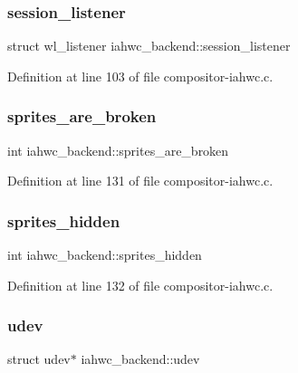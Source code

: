\subsubsection{\texorpdfstring{session\+\_\+listener}{session\_listener}}
{\footnotesize\ttfamily struct wl\+\_\+listener iahwc\+\_\+backend\+::session\+\_\+listener}



Definition at line 103 of file compositor-\/iahwc.\+c.

\mbox{\label{structiahwc__backend_ad046cdbf61ed56df228151a267a93f5d}} 
\subsubsection{\texorpdfstring{sprites\+\_\+are\+\_\+broken}{sprites\_are\_broken}}
{\footnotesize\ttfamily int iahwc\+\_\+backend\+::sprites\+\_\+are\+\_\+broken}



Definition at line 131 of file compositor-\/iahwc.\+c.

\mbox{\label{structiahwc__backend_ac14877b403d04d40e989df9ae9482722}} 
\subsubsection{\texorpdfstring{sprites\+\_\+hidden}{sprites\_hidden}}
{\footnotesize\ttfamily int iahwc\+\_\+backend\+::sprites\+\_\+hidden}



Definition at line 132 of file compositor-\/iahwc.\+c.

\mbox{\label{structiahwc__backend_abeae3866ace09fded61e453b79f65bb3}} 
\subsubsection{\texorpdfstring{udev}{udev}}
{\footnotesize\ttfamily struct udev$\ast$ iahwc\+\_\+backend\+::udev}



